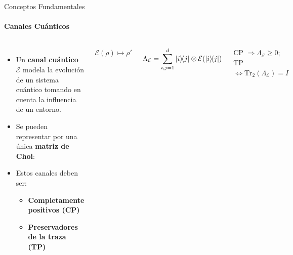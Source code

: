\documentclass[aspectratio=169,xcolor=dvipsnames]{beamer}
\begin{document}

\begin{frame}{Conceptos Fundamentales}
\framesubtitle{Canales Cuánticos}

\begin{columns}
  \begin{itemize}
    \item Un \textbf{canal cuántico} $\mathcal{E}$ modela la evolución de un sistema cuántico tomando en cuenta la influencia de un entorno.
    \bigskip
        \item Se pueden representar por una única \textbf{matriz de Choi}:
    \bigskip
            \item Estos canales deben ser:
        \begin{itemize}
            \item \textbf{Completamente positivos (CP)}
            \item \textbf{Preservadores de la traza (TP)}
        \end{itemize}

  \end{itemize}

  \vspace{0.3em}
  \centering
  $\mathcal{E}(\rho) \mapsto \rho'$
  
  \bigskip
  $\displaystyle
  \Lambda_{\mathcal{E}}
  = \sum_{i,j=1}^{d} \ketbra{i}{j} \otimes \mathcal{E}(\ketbra{i}{j})
  $
  
  \bigskip
  \bigskip
  \scriptsize
  CP $\Rightarrow \Lambda_{\mathcal{E}}\geq 0$\quad;\quad
  TP $\Leftrightarrow \mathrm{Tr}_2(\Lambda_{\mathcal{E}})=I$
  
\end{columns}
\end{frame}
\end{document}
